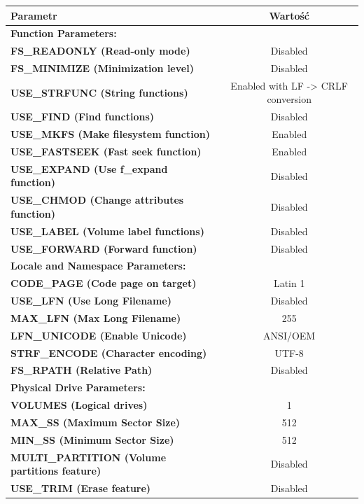 \documentclass[10pt, a4paper]{article}
\begin{document}
\begin{table}[H]
	\centering
	\begin{tabular}{|l|c|} \hline
		\textbf{Parametr} & Wartość \\
		\hline
	\hline  \textbf{Function Parameters:}\\
\hline  \textbf{FS{\_}READONLY (Read-only mode)} & Disabled \\
\hline  \textbf{FS{\_}MINIMIZE (Minimization level)} &  Disabled\\
\hline  \textbf{USE{\_}STRFUNC (String functions)} &  Enabled with LF -> CRLF conversion\\
\hline  \textbf{USE{\_}FIND (Find functions) } & Disabled\\
\hline  \textbf{USE{\_}MKFS (Make filesystem function)} &  Enabled\\
\hline  \textbf{USE{\_}FASTSEEK (Fast seek function)} &  Enabled\\
\hline  \textbf{USE{\_}EXPAND (Use f{\_}expand function) } & Disabled\\
\hline  \textbf{USE{\_}CHMOD (Change attributes function)} &  Disabled\\
\hline  \textbf{USE{\_}LABEL (Volume label functions)} &  Disabled\\
\hline  \textbf{USE{\_}FORWARD (Forward function) } & Disabled\\
\hline  \textbf{Locale and Namespace Parameters:}\\
\hline  \textbf{CODE{\_}PAGE (Code page on target)} &  Latin 1\\
\hline  \textbf{USE{\_}LFN (Use Long Filename)} &  Disabled\\
\hline  \textbf{MAX{\_}LFN (Max Long Filename)} &  255\\
\hline  \textbf{LFN{\_}UNICODE (Enable Unicode)} &  ANSI/OEM\\
\hline  \textbf{STRF{\_}ENCODE (Character encoding) } & UTF-8\\
\hline  \textbf{FS{\_}RPATH (Relative Path) } & Disabled\\
\hline  \textbf{Physical Drive Parameters:}  \\
\hline  \textbf{VOLUMES (Logical drives)} &  1\\
\hline  \textbf{MAX{\_}SS (Maximum Sector Size)} &  512\\
\hline  \textbf{MIN{\_}SS (Minimum Sector Size)} &  512\\
\hline  \textbf{MULTI{\_}PARTITION (Volume partitions feature)} &  Disabled\\
\hline  \textbf{USE{\_}TRIM (Erase feature)} &  Disabled\\

\end{tabular}
\end{table}
\end{document}
